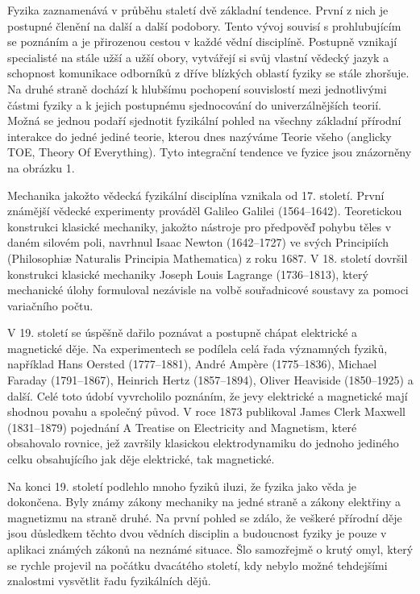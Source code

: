     Fyzika zaznamenává v průběhu staletí dvě základní tendence. První z nich je postupné členění na
    další a další podobory. Tento vývoj souvisí s prohlubujícím se poznáním a je přirozenou cestou v
    každé vědní disciplíně. Postupně vznikají specialisté na stále užší a užší obory, vytvářejí si
    svůj vlastní vědecký jazyk a schopnost komunikace odborníků z dříve blízkých oblastí fyziky se
    stále zhoršuje. Na druhé straně dochází k hlubšímu pochopení souvislostí mezi jednotlivými
    částmi fyziky a k jejich postupnému sjednocování do univerzálnějších teorií. Možná se jednou
    podaří sjednotit fyzikální pohled na všechny základní přírodní interakce do jedné jediné teorie,
    kterou dnes nazýváme Teorie všeho (anglicky TOE, Theory Of Everything). Tyto integrační tendence
    ve fyzice jsou znázorněny na obrázku 1. 

    
    Mechanika jakožto vědecká fyzikální disciplína vznikala od 17. století. První známější vědecké
    experimenty prováděl Galileo Galilei (1564–1642). Teoretickou konstrukci klasické mechaniky,
    jakožto nástroje pro předpověď pohybu těles v daném silovém poli, navrhnul Isaac Newton
    (1642–1727) ve svých Principiích (Philosophiæ Naturalis Principia Mathematica) z roku 1687. V
    18. století dovršil konstrukci klasické mechaniky Joseph Louis Lagrange (1736–1813), který
    mechanické úlohy formuloval nezávisle na volbě souřadnicové soustavy za pomoci variačního počtu.
    
    V 19. století se úspěšně dařilo poznávat a postupně chápat elektrické a magnetické děje. Na
    experimentech se podílela celá řada významných fyziků, například Hans Oersted (1777–1881), André
    Ampère (1775–1836), Michael Faraday (1791–1867), Heinrich Hertz (1857–1894), Oliver Heaviside
    (1850–1925) a další. Celé toto údobí vyvrcholilo poznáním, že jevy elektrické a magnetické mají
    shodnou povahu a společný původ. V roce 1873 publikoval James Clerk Maxwell (1831–1879)
    pojednání A Treatise on Electricity and Magnetism, které obsahovalo rovnice, jež završily
    klasickou elektrodynamiku do jednoho jediného celku obsahujícího jak děje elektrické, tak
    magnetické. 
    
    Na konci 19. století podlehlo mnoho fyziků iluzi, že fyzika jako věda je dokončena. Byly známy
    zákony mechaniky na jedné straně a zákony elektřiny a magnetizmu na straně druhé. Na první
    pohled se zdálo, že veškeré přírodní děje jsou důsledkem těchto dvou vědních disciplin a
    budoucnost fyziky je pouze v aplikaci známých zákonů na neznámé situace. Šlo samozřejmě o krutý
    omyl, který se rychle projevil na počátku dvacátého století, kdy nebylo možné tehdejšími
    znalostmi vysvětlit řadu fyzikálních dějů. 
   

